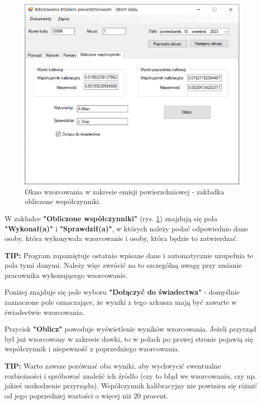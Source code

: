 	\begin{figure}[htb]
		\centering
		\includegraphics[width=\columnwidth]{obrazki/Wzorcowanie/emisja/wspolczynniki.png}
		\caption{Okno wzorcowania w zakresie emisji powierzchniowej - zakładka obliczone współczynniki.}
		\label{emisjaWspolczynniki}
	\end{figure}
	
	W zakładce \textbf{"Obliczone współczynniki"} (rys. \ref{emisjaWspolczynniki}) znajdują się pola \textbf{"Wykonał(a)"} i \textbf{"Sprawdził(a)"}, w których należy podać odpowiednio dane osoby, która wykonywała wzorcowanie i osoby, która będzie to zatwierdzać. 
	
	\textbf{TIP:} Program zapamiętuje ostatnio wpisane dane i automatycznie uzupełnia te pola tymi danymi. Należy więc zwrócić na to szczególną uwagę przy zmianie pracownika wykonującego wzorcowanie.
	
	Poniżej znajduje się pole wyboru \textbf{"Dołączyć do świadectwa"} - domyślnie zaznaczone pole oznaczające, że wyniki z tego arkusza mają być zawarte w świadectwie wzorcowania.
	
	Przycisk \textbf{"Oblicz"} powoduje wyświetlenie wyników wzorcowania. Jeżeli przyrząd był już wzorcowany w zakresie dawki, to w polach po prawej stronie pojawią się współczynnik i niepewność z poprzedniego wzorcowania. 
	
	\textbf{TIP:} Warto zawsze porównać oba wyniki, aby wychwycić ewentualne rozbieżności i spróbować znaleźć ich źródło (czy to błąd we wzorcowaniu, czy np. jakieś uszkodzenie przyrządu). Współczynnik kalibracyjny nie powinien się różnić od jego poprzedniej wartości o więcej niż 20 procent.

